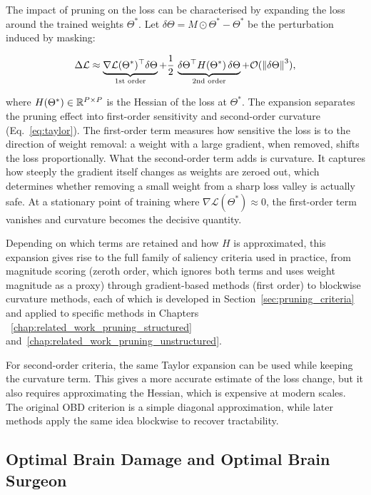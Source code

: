 The impact of pruning on the loss can be characterised by expanding the loss around the trained weights $\Theta^*$. Let $\delta\Theta = M \odot \Theta^* - \Theta^*$ be the perturbation induced by masking:

\begin{equation}
	\Delta\mathcal{L}
	\approx
	\underbrace{\nabla\mathcal{L}(\Theta^*)^\top \delta\Theta}_{\text{1st order}}
	+
	\frac{1}{2}\,\underbrace{\delta\Theta^\top H(\Theta^*)\,\delta\Theta}_{\text{2nd order}}
	+ \mathcal{O}(\left\lVert \delta\Theta \right\rVert^3),
	\label{eq:taylor}
\end{equation}

where $H(\Theta^*) \in \mathbb{R}^{P \times P}$ is the Hessian of the loss at $\Theta^*$. The expansion separates the pruning effect into first-order sensitivity and second-order curvature (Eq.~\eqref{eq:taylor}). The first-order term measures how sensitive the loss is to the direction of weight removal: a weight with a large gradient, when removed, shifts the loss proportionally. What the second-order term adds is curvature. It captures how steeply the gradient itself changes as weights are zeroed out, which determines whether removing a small weight from a sharp loss valley is actually safe. At a stationary point of training where $\nabla\mathcal{L}(\Theta^*) \approx 0$, the first-order term vanishes and curvature becomes the decisive quantity.

Depending on which terms are retained and how $H$ is approximated, this expansion gives rise to the full family of saliency criteria used in practice, from magnitude scoring (zeroth order, which ignores both terms and uses weight magnitude as a proxy) through gradient-based methods (first order) to blockwise curvature methods, each of which is developed in Section~\ref{sec:pruning_criteria} and applied to specific methods in Chapters ~\ref{chap:related_work_pruning_structured} and~\ref{chap:related_work_pruning_unstructured}.

For second-order criteria, the same Taylor expansion can be used while keeping
the curvature term. This gives a more accurate estimate of the loss change,
but it also requires approximating the Hessian, which is expensive at modern
scales. The original OBD criterion is a simple diagonal approximation, while
later methods apply the same idea blockwise to recover tractability.

\subsection{Optimal Brain Damage and Optimal Brain Surgeon}
\label{subsec:obd_obs}

